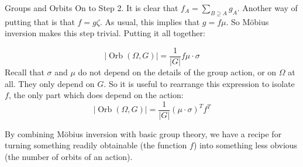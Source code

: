 \documentclass[12pt]{pom_thesis}
\DeclareMathOperator{\orb}{Orb}
\DeclareMathOperator{\fixx}{fix}
\begin{document}
\begin{chapter}{Groups and Orbits}
On to Step 2. It is clear that $f_A = \sum_{B \supseteq A} g_A$. Another way of putting that is that $f = g\zeta$. As usual, this implies that $g = f\mu$. So M\"obius inversion makes this step trivial. Putting it all together:

\[
|\orb(\Omega, G)| = \frac {1}{|G|}f\mu \cdot \sigma
\]
Recall that $\sigma$ and $\mu$ do not depend on the details of the group action, or on $\Omega$ at all. They only depend on $G$. So it is useful to rearrange this expression to isolate $f$, the only part which does depend on the action:
\[
|\orb(\Omega, G)| = \frac {1}{|G|}(\mu \cdot \sigma)^Tf^T
\]

By combining M\"obius inversion with basic group theory, we have a recipe for turning something readily obtainable (the function $f$) into something less obvious (the number of orbits of an action).

\end{chapter}
\end{document}
